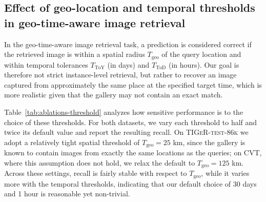 \subsection{Effect of geo-location and temporal thresholds in geo-time-aware image retrieval}

In the geo-time-aware image retrieval task, a prediction is considered correct if the retrieved image is within a spatial radius $T_{\text{geo}}$ of the query location and within temporal tolerances $T_{\text{ToY}}$ (in days) and $T_{\text{ToD}}$ (in hours). Our goal is therefore not strict instance-level retrieval, but rather to recover an image captured from approximately the same place at the specified target time, which is more realistic given that the gallery may not contain an exact match.

Table~\ref{tab:ablations-threshold} analyzes how sensitive performance is to the choice of these thresholds. For both datasets, we vary each threshold to half and twice its default value and report the resulting recall. On \textsc{TIGeR-test-86k} we adopt a relatively tight spatial threshold of $T_{\text{geo}}=25$ km, since the gallery is known to contain images from exactly the same locations as the queries; on CVT, where this assumption does not hold, we relax the default to $T_{\text{geo}}=125$ km. Across these settings, recall is fairly stable with respect to $T_{\text{geo}}$, while it varies more with the temporal thresholds, indicating that our default choice of 30 days and 1 hour is reasonable yet non-trivial.


